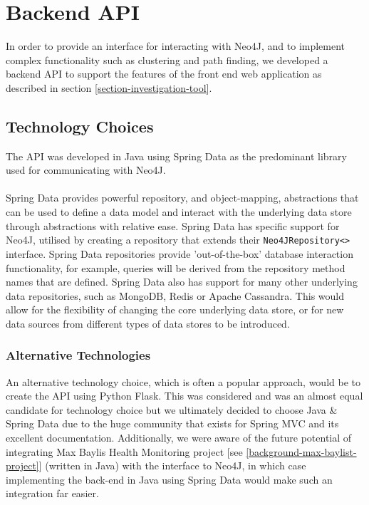 \chapter{Backend API}\label{section-backend-api}
In order to provide an interface for interacting with Neo4J, and to implement complex functionality such as clustering and path finding, we developed a backend API to support the features of the front end web application as described in section \ref{section-investigation-tool}. 

\section{Technology Choices}
The API was developed in Java using Spring Data as the predominant library used for communicating with Neo4J. 
\\\\
Spring Data provides powerful repository, and object-mapping, abstractions that can be used to define a data model and interact with the underlying data store through abstractions with relative ease. Spring Data has specific support for Neo4J, utilised by creating a repository that extends their \texttt{Neo4JRepository<>} interface. Spring Data repositories provide 'out-of-the-box' database interaction functionality, for example, queries will be derived from the repository method names that are defined. Spring Data also has support for many other underlying data repositories, such as MongoDB, Redis or Apache Cassandra. This would allow for the flexibility of changing the core underlying data store, or for new data sources from different types of data stores to be introduced.

\subsection{Alternative Technologies}
An alternative technology choice, which is often a popular approach, would be to create the API using Python Flask. This was considered and was an almost equal candidate for technology choice but we ultimately decided to choose Java \& Spring Data due to the huge community that exists for Spring MVC and its excellent documentation. Additionally, we were aware of the future potential of integrating Max Baylis Health Monitoring project [see \ref{background-max-baylist-project}] (written in Java) with the interface to Neo4J, in which case implementing the back-end in Java using Spring Data would make such an integration far easier. 



